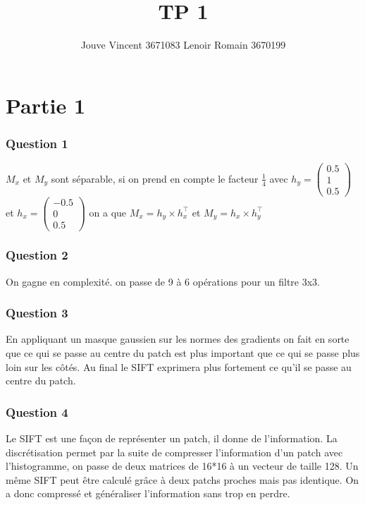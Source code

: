 \documentclass[11pt]{article}
\title{TP 1}
\author{Jouve Vincent 3671083 Lenoir Romain 3670199}
\date{}
\begin{document}
 
\maketitle 

\part*{\Large Partie 1}
\section*{\large Question 1}
$M_x$ et $M_y$ sont séparable, si on prend en compte le facteur $\frac{1}{4}$ avec $h_y = \begin{pmatrix}0.5\\1\\0.5\end{pmatrix}$
et $h_x = \begin{pmatrix}-0.5\\0\\0.5\end{pmatrix}$ on a que $M_x = h_y \times h_x^\top$ et $M_y = h_x \times h_y^\top$

\section*{\large Question 2}
On gagne en complexité. on passe de 9 à 6 opérations pour un filtre 3x3.

\section*{\large Question 3}
En appliquant un masque gaussien sur les normes des gradients on fait en sorte que ce qui se passe au centre du patch est plus important que ce qui se passe plus loin sur les côtés. Au final le SIFT exprimera plus fortement ce qu'il se passe au centre du patch.

\section*{\large Question 4}
Le SIFT est une façon de représenter un patch, il donne de l'information. La discrétisation permet par la suite de compresser l'information d'un patch avec l'histogramme, on passe de deux matrices de 16*16 à un vecteur de taille 128. Un même SIFT peut être calculé grâce à deux patchs proches mais pas identique. On a donc compressé et généraliser l'information sans trop en perdre.
\end{document}

